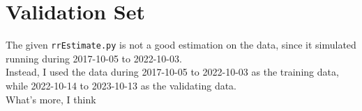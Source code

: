 \section{Validation Set}

The given \texttt{rrEstimate.py} is not a good estimation on the data, since it simulated running during 2017-10-05 to 2022-10-03.\\
Instead, I used the data during 2017-10-05 to 2022-10-03 as the training data, while 2022-10-14 to 2023-10-13 as the validating data.\\
What's more, I think
